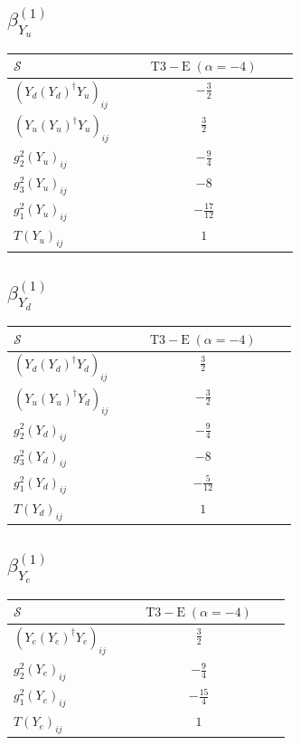 \documentclass[9pt]{article}
\begin{document}
\subsection*{$ \beta_{Y_u}^{(1)} $}
\begin{longtable}{@{}p{0.38\linewidth}c@{}}
\toprule
$\mathcal{S}$ & $ \mathrm{T3-E}\;(\alpha=-4) $ \\
\midrule
$ (Y_d (Y_d)^{\dagger} Y_u)_{ij} $ & $ - \frac{3}{2} $ \\
$ (Y_u (Y_u)^{\dagger} Y_u)_{ij} $ & $ \frac{3}{2} $ \\
$ g_2^2 (Y_u)_{ij} $ & $ - \frac{9}{4} $ \\
$ g_3^2 (Y_u)_{ij} $ & $ -8 $ \\
$ g_1^2 (Y_u)_{ij} $ & $ - \frac{17}{12} $ \\
$ T (Y_u)_{ij} $ & $ 1 $ \\
\bottomrule
\end{longtable}
\subsection*{$ \beta_{Y_d}^{(1)} $}
\begin{longtable}{@{}p{0.38\linewidth}c@{}}
\toprule
$\mathcal{S}$ & $ \mathrm{T3-E}\;(\alpha=-4) $ \\
\midrule
$ (Y_d (Y_d)^{\dagger} Y_d)_{ij} $ & $ \frac{3}{2} $ \\
$ (Y_u (Y_u)^{\dagger} Y_d)_{ij} $ & $ - \frac{3}{2} $ \\
$ g_2^2 (Y_d)_{ij} $ & $ - \frac{9}{4} $ \\
$ g_3^2 (Y_d)_{ij} $ & $ -8 $ \\
$ g_1^2 (Y_d)_{ij} $ & $ - \frac{5}{12} $ \\
$ T (Y_d)_{ij} $ & $ 1 $ \\
\bottomrule
\end{longtable}
\subsection*{$ \beta_{Y_e}^{(1)} $}
\begin{longtable}{@{}p{0.38\linewidth}c@{}}
\toprule
$\mathcal{S}$ & $ \mathrm{T3-E}\;(\alpha=-4) $ \\
\midrule
$ (Y_e (Y_e)^{\dagger} Y_e)_{ij} $ & $ \frac{3}{2} $ \\
$ g_2^2 (Y_e)_{ij} $ & $ - \frac{9}{4} $ \\
$ g_1^2 (Y_e)_{ij} $ & $ - \frac{15}{4} $ \\
$ T (Y_e)_{ij} $ & $ 1 $ \\
\bottomrule
\end{longtable}
\end{document}
